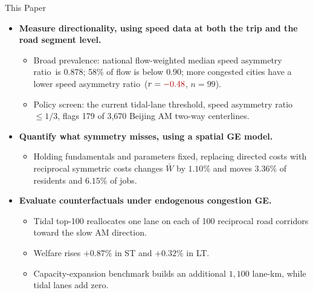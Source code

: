 \documentclass[11pt,aspectratio=169]{beamer}
\newcommand{\good}[1]{\textcolor{blue!70!black}{#1}}
\newcommand{\bad}[1]{\textcolor{red!70!black}{#1}}
\newcommand{\SAR}{speed asymmetry ratio}
\begin{document}
\begin{frame}{This Paper}
\small
\begin{itemize}
  \item \textbf{Measure directionality, using speed data at both the trip and the road segment level.}
  \begin{itemize}\footnotesize
    \item Broad prevalence: national flow-weighted median \SAR\ is \good{0.878}; \good{58\%} of flow is below 0.90; more congested cities have a lower \SAR\ ($r=\bad{-0.48}$, $n=99$).
    \item Policy screen: the current tidal-lane threshold, \SAR\ $\leq 1/3$, flags \good{179 of 3{,}670} Beijing AM two-way centerlines.
  \end{itemize}
  \item \textbf{Quantify what symmetry misses, using a spatial GE model.}
  \begin{itemize}\footnotesize
    \item Holding fundamentals and parameters fixed, replacing directed costs with reciprocal symmetric costs changes $\bar W$ by \good{$1.10\%$} and moves \good{$3.36\%$} of residents and \good{$6.15\%$} of jobs.
  \end{itemize}
  \item \textbf{Evaluate counterfactuals under endogenous congestion GE.}
  \begin{itemize}\footnotesize
    \item Tidal top-100 reallocates one lane on each of 100 reciprocal road corridors toward the slow AM direction.
    \item Welfare rises \good{$+0.87\%$} in ST and \good{$+0.32\%$} in LT.
    \item Capacity-expansion benchmark builds an additional \good{$1{,}100$ lane-km}, while tidal lanes add \good{zero}.
  \end{itemize}
\end{itemize}
\end{frame}
\end{document}
